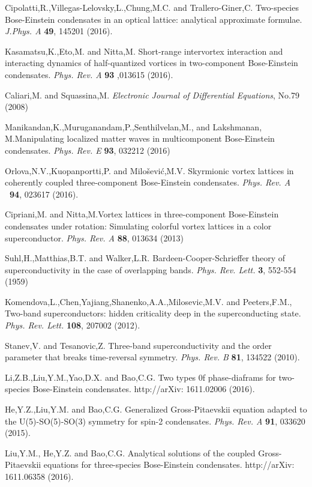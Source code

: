 \documentclass[single-column,showpacs,groupedaddress]{revtex4}
\begin{document}
\begin{thebibliography}{99}
 Cipolatti,R.,Villegas-Lelovsky,L.,Chung,M.C. and
Trallero-Giner,C. Two-species Bose-Einstein condensates in an optical
lattice: analytical approximate formulae. \textit{J.Phys. A} \textbf{49},
145201 (2016).

 Kasamatsu,K.,Eto,M. and Nitta,M. Short-range intervortex
interaction and interacting dynamics of half-quantized vortices in
two-component Bose-Einstein condensates. \textit{Phys. Rev. A} \textbf{93}%
,013615 (2016).

 Caliari,M. and Squassina,M. \textit{Electronic Journal of
Differential Equations}, No.79 (2008)

 Manikandan,K.,Muruganandam,P.,Senthilvelan,M., and Lakshmanan,
M.Manipulating localized matter waves in multicomponent Bose-Einstein
condensates. \textit{Phys. Rev. E} \textbf{93}, 032212 (2016)

 Orlova,N.V.,Kuopanportti,P. and Milo\v{s}evi\'{c},M.V.
Skyrmionic vortex lattices in coherently coupled three-component
Bose-Einstein condensates. \textit{Phys. Rev. A} \textbf{\ 94}, 023617
(2016).

 Cipriani,M. and Nitta,M.Vortex lattices in three-component
Bose-Einstein condensates under rotation: Simulating colorful vortex
lattices in a color superconductor. \textit{Phys. Rev. A} \textbf{88},
013634 (2013)

 Suhl,H.,Matthias,B.T. and Walker,L.R. Bardeen-Cooper-Schrieffer
theory of superconductivity in the case of overlapping bands. \textit{Phys.
Rev. Lett.} \textbf{3}, 552-554 (1959)

 Komendova,L.,Chen,Yajiang,Shanenko,A.A.,Milosevic,M.V. and
Peeters,F.M., Two-band superconductors: hidden criticality deep in the
superconducting state. \textit{Phys. Rev. Lett.} \textbf{108}, 207002 (2012).

 Stanev,V. and Tesanovic,Z. Three-band superconductivity and the
order parameter that breaks time-reversal symmetry. \textit{Phys. Rev. B}
\textbf{81}, 134522 (2010).

 Li,Z.B.,Liu,Y.M.,Yao,D.X. and Bao,C.G. Two types 0f
phase-diaframs for two-species Bose-Einstein condensates. http://arXiv:
1611.02006 (2016).

 He,Y.Z.,Liu,Y.M. and Bao,C.G. Generalized Gross-Pitaevskii
equation adapted to the U(5)-SO(5)-SO(3) symmetry for spin-2 condensates.
\textit{Phys. Rev. A} \textbf{91}, 033620 (2015).

 Liu,Y.M., He,Y.Z. and Bao,C.G. Analytical solutions of the
coupled Gross-Pitaevskii equations for three-species Bose-Einstein
condensates. http://arXiv: 1611.06358 (2016).
\end{thebibliography}
\end{document}
